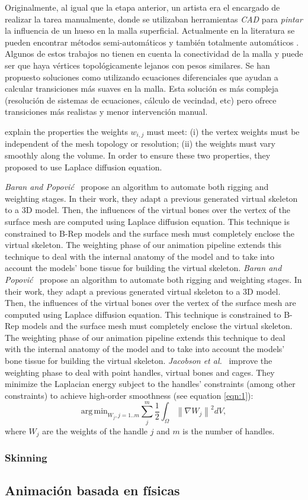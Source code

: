 Originalmente, al igual que la etapa anterior, un artista era el encargado de realizar la tarea manualmente, donde se utilizaban herramientas \emph{CAD} para \emph{pintar} la influencia de un hueso en la malla superficial. Actualmente en la literatura se pueden encontrar métodos semi-automáticos\cite{a} y también totalmente automáticos \cite{}. 
Algunos de estos trabajos no tienen en cuenta la conectividad de la malla y puede ser que haya vértices topológicamente lejanos con pesos similares. Se han propuesto soluciones como \cite{Baran:2007} utilizando ecuaciones diferenciales que ayudan a calcular transiciones más suaves en la malla. Esta solución es más compleja (resolución de sistemas de ecuaciones, cálculo de vecindad, etc) pero ofrece transiciones más realistas y menor intervención manual.

explain the properties the weights $w_{i,j}$ must meet: (i) the vertex weights must be independent of the mesh topology or resolution; (ii) the weights must vary smoothly along the volume. In order to ensure these two properties, they proposed to use Laplace diffusion equation.

\emph{Baran and Popovi\'{c}}~\cite{Baran:2007} propose an algorithm to automate both rigging and weighting stages. In their work, they adapt a previous generated virtual skeleton to a 3D model. Then, the influences of the virtual bones over the vertex of the surface mesh are computed using Laplace diffusion equation. This technique is constrained to B-Rep models and the surface mesh must completely enclose the virtual skeleton. 
The weighting phase of our animation pipeline extends this technique to deal with the internal anatomy of the model and to take into account the models’ bone tissue for building the virtual skeleton.
\emph{Baran and Popovi\'{c}}~\cite{Baran:2007} propose an algorithm to automate both rigging and weighting stages. In their work, they adapt a previous generated virtual skeleton to a 3D model. Then, the influences of the virtual bones over the vertex of the surface mesh are computed using Laplace diffusion equation. This technique is constrained to B-Rep models and the surface mesh must completely enclose the virtual skeleton. 
The weighting phase of our animation pipeline extends this technique to deal with the internal anatomy of the model and to take into account the models’ bone tissue for building the virtual skeleton. 
\emph{Jacobson et al.}~\cite{Jac2011} improve the weighting phase to deal with point handles, virtual bones and cages. They minimize the Laplacian energy subject to the handles' constraints (among other constraints) to achieve high-order smoothness (see equation \ref{eqn:1}):
\begin{equation}
\label{eqn:1}
\mathrm{arg\,min}_{W_j, j=1..m}\sum_{j}^m\frac{1}{2}\int_\Omega \left \|  \nabla W_j\right \|^2 dV,
\end{equation}
where $W_j$ are the weights of the handle $j$ and $m$ is the number of handles. 

\subsubsection{Skinning}
\label{art:skinning}

\subsection{Animación basada en físicas}